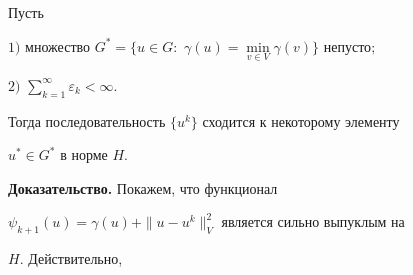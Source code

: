 \begin{thmnonum}


Пусть





$1)$ множество $G^*=\{u\in G:$ $\gamma(u)=\min\limits_{v\in


V}\gamma(v)\}$ непусто\/$;$





$2)$ $\sum\limits_{k=1}^\infty \varepsilon_k<\infty$.





Тогда последовательность $\{u^k\}$ сходится к некоторому элементу


$u^*\in G^*$ в норме $H$.


\end{thmnonum}





{\bf Доказательство.} Покажем, что функционал


$\psi_{k+1}(u)=\gamma(u)+\|u-u^k\|^2_V$ является сильно выпуклым на


$H$. Действительно,


